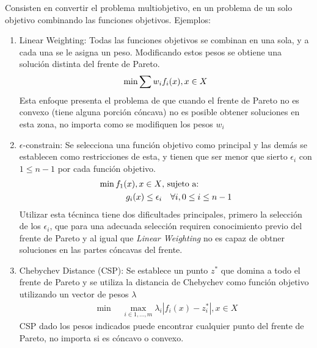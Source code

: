 Consisten en convertir el problema multiobjetivo, en un problema de un solo objetivo combinando las funciones objetivos. Ejemplos:
\begin{enumerate}
    \item Linear Weighting: Todas las funciones objetivos se combinan en una sola, y a cada una se le asigna un peso. Modificando estos pesos se obtiene una soluci\'on distinta del frente de Pareto.\\
    \begin{align*}
        \min \sum w_i f_i(x), \space x \in X
    \end{align*}
    Esta enfoque presenta el problema de que cuando el frente de Pareto no es convexo (tiene alguna porci\'on c\'oncava) no es posible obtener soluciones en esta zona, no importa como se modifiquen los pesos $w_i$

    \item $\epsilon$-constrain: Se selecciona una funci\'on objetivo como principal y las dem\'as se establecen como restricciones de esta, y tienen que ser menor que sierto $\epsilon_i$ con $1 \leq n - 1$ por cada funci\'on objetivo.
    \begin{align*}
            \min  f_1(x), \space x \in X  & \text{, sujeto a:}   \\
            g_i(x) \leq \epsilon_i & \quad  \forall i, 0 \leq i \leq n - 1
    \end{align*}
    Utilizar esta t\'ecninca tiene dos dificultades principales, primero la selecci\'on de los $\epsilon_i$, que para una adecuada selecci\'on requiren conocimiento previo del frente de Pareto y al igual que \textit{Linear Weighting} no es capaz de obtner soluciones en las partes c\'oncavas del frente.

    \item Chebychev Distance (CSP): Se establece un punto $z^*$ que domina a todo el frente de Pareto y se utiliza la distancia de Chebychev como funci\'on objetivo utilizando un vector de pesos $\lambda$
    \begin{align*}
        \min \quad \max_{i \in {1,...,m}} \lambda_i |f_i(x) - z^*_i|, x \in X 
    \end{align*}
    CSP dado los pesos indicados puede encontrar cualquier punto del frente de Pareto, no importa si es c\'oncavo o convexo.

\end{enumerate}


